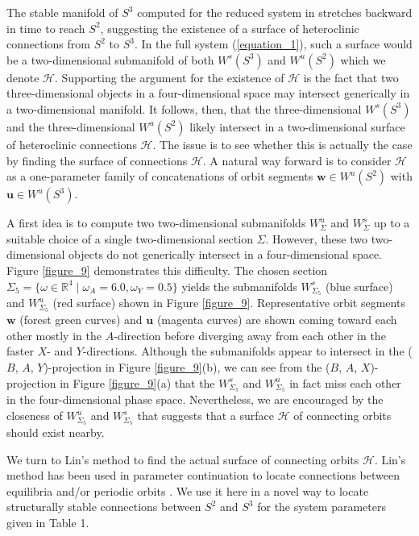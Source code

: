 \documentclass{ws-ijbc}
\begin{document}
The stable manifold of $S^3$ computed for the reduced system in \cite{QSSA} stretches backward in time to reach $S^2$, suggesting the existence of a surface of heteroclinic connections from $S^2$ to $S^3$.  In the full system (\ref{equation_1}), such a surface would be a two-dimensional submanifold of both $W^s(S^3)$ and $W^u(S^2)$ which we denote $\mathscr{H}$.  Supporting the argument for the existence of $\mathscr{H}$ is the fact that two three-dimensional objects in a four-dimensional space  may intersect generically in a two-dimensional manifold.  It follows, then, that the three-dimensional $W^s(S^3)$ and the three-dimensional $W^u(S^2)$ likely intersect in a two-dimensional surface of heteroclinic connections $\mathscr{H}$.  The issue is to see whether this is actually the case by finding the surface of connections $\mathscr{H}$.  A natural way forward is to consider $\mathscr{H}$ as a one-parameter family of concatenations of orbit segments $\mathbf{w} \in W^u(S^2)$ with $\mathbf{u} \in W^u(S^3)$.

A first idea is to compute two two-dimensional submanifolds $W^u_\Sigma$ and $W^s_\Sigma$ up to a suitable choice of a single two-dimensional section $\Sigma$.  However, these two two-dimensional objects do not generically intersect in a four-dimensional space.  Figure \ref{figure_9} demonstrates this difficulty.  The chosen section $\Sigma_5=\{\omega \in \mathbb{R}^4 \;|\; \omega_A= 6.0, \omega_Y=0.5 \}$ yields the submanifolds $W^s_{\Sigma_5}$ (blue surface) and $W^u_{\Sigma_5}$ (red surface) shown in Figure \ref{figure_9}.  Representative orbit segments $\mathbf{w}$ (forest green curves) and $\mathbf{u}$ (magenta curves) are shown coming toward each other mostly in the $A$-direction before diverging away from each other in the faster $X$- and $Y$-directions.  Although the submanifolds appear to intersect in the ($B$, $A$, $Y$)-projection in Figure \ref{figure_9}(b), we can see from the ($B$, $A$, $X$)-projection in Figure \ref{figure_9}(a) that the $W^s_{\Sigma_5}$ and $W^u_{\Sigma_5}$ in fact miss each other in the four-dimensional phase space.  Nevertheless, we are encouraged by the closeness of $W^u_{\Sigma_5}$ and $W^s_{\Sigma_5}$ that suggests that a surface $\mathscr{H}$ of connecting orbits should exist nearby.

We turn to Lin's method to find the actual surface of connecting orbits $\mathscr{H}$.  Lin's method has been used in parameter continuation to locate connections between equilibria and/or periodic orbits \cite{Lin_original, Lin_POs, Lin_POs2}.  We use it here in a novel way to locate structurally stable connections between $S^2$ and $S^3$ for the system parameters given in Table 1.
\end{document}
